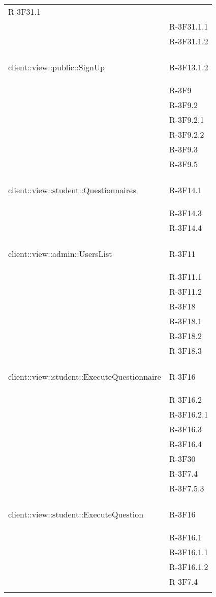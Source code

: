 \begin{longtable}{l p{3cm}}
	R-3F31.1 \tabularnewline &
	
	R-3F31.1.1 \tabularnewline &
	
	R-3F31.1.2 \tabularnewline &\tabularnewline
	\hline
	\hypertarget{client::view::public::SignUp}{client::view::public::SignUp} & R-3F13.1.2 \tabularnewline &
	
	R-3F9 \tabularnewline &
	
	R-3F9.2 \tabularnewline &
	
	R-3F9.2.1 \tabularnewline &
	
	R-3F9.2.2 \tabularnewline &
	
	R-3F9.3 \tabularnewline &
	
	R-3F9.5 \tabularnewline &\tabularnewline
	\hline
	\hypertarget{client::view::student::Questionnaires}{client::view::student::Questionnaires} & R-3F14.1 \tabularnewline &
	
	R-3F14.3 \tabularnewline &
	
	R-3F14.4 \tabularnewline &\tabularnewline
	\hline
	\hypertarget{client::view::admin::UsersList}{client::view::admin::UsersList} & R-3F11 \tabularnewline &
	
	R-3F11.1 \tabularnewline &
	
	R-3F11.2 \tabularnewline &
	
	R-3F18 \tabularnewline &
	
	R-3F18.1 \tabularnewline &
	
	R-3F18.2 \tabularnewline &
	
	R-3F18.3 \tabularnewline &\tabularnewline
	\hline
	\hypertarget{client::view::student::ExecuteQuestionnaire}{client::view::student::ExecuteQuestionnaire} & R-3F16 \tabularnewline &
	
	R-3F16.2 \tabularnewline &
	
	R-3F16.2.1 \tabularnewline &
	
	R-3F16.3 \tabularnewline &
	
	R-3F16.4 \tabularnewline &
	
	R-3F30 \tabularnewline &
	
	R-3F7.4 \tabularnewline &
	
	R-3F7.5.3 \tabularnewline &\tabularnewline
	\hline
	\hypertarget{client::view::student::ExecuteQuestion}{client::view::student::ExecuteQuestion} & R-3F16 \tabularnewline &
	
	R-3F16.1 \tabularnewline &
	
	R-3F16.1.1 \tabularnewline &
	
	R-3F16.1.2 \tabularnewline &
	
	R-3F7.4 \tabularnewline &
	

\end{longtable}
